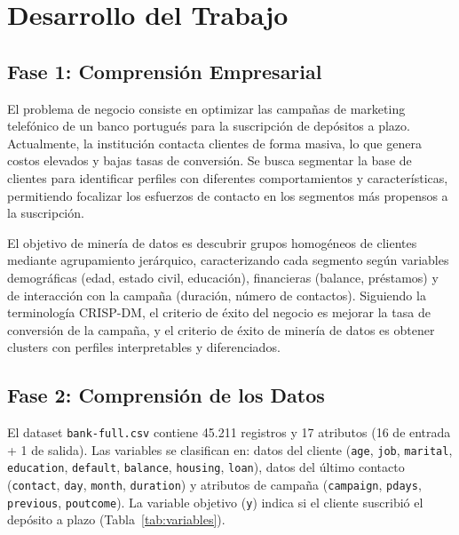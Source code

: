 \documentclass[10pt,a4paper]{article}
\begin{document}
\section{Desarrollo del Trabajo}

\subsection{Fase 1: Comprensión Empresarial}

El problema de negocio consiste en optimizar las campañas de marketing telefónico de un banco portugués para la suscripción de depósitos a plazo. Actualmente, la institución contacta clientes de forma masiva, lo que genera costos elevados y bajas tasas de conversión. Se busca segmentar la base de clientes para identificar perfiles con diferentes comportamientos y características, permitiendo focalizar los esfuerzos de contacto en los segmentos más propensos a la suscripción.

El objetivo de minería de datos es descubrir grupos homogéneos de clientes mediante agrupamiento jerárquico, caracterizando cada segmento según variables demográficas (edad, estado civil, educación), financieras (balance, préstamos) y de interacción con la campaña (duración, número de contactos). Siguiendo la terminología CRISP-DM, el criterio de éxito del negocio es mejorar la tasa de conversión de la campaña, y el criterio de éxito de minería de datos es obtener clusters con perfiles interpretables y diferenciados.

\subsection{Fase 2: Comprensión de los Datos}

El dataset \texttt{bank-full.csv} contiene 45.211 registros y 17 atributos (16 de entrada + 1 de salida). Las variables se clasifican en: datos del cliente (\texttt{age}, \texttt{job}, \texttt{marital}, \texttt{education}, \texttt{default}, \texttt{balance}, \texttt{housing}, \texttt{loan}), datos del último contacto (\texttt{contact}, \texttt{day}, \texttt{month}, \texttt{duration}) y atributos de campaña (\texttt{campaign}, \texttt{pdays}, \texttt{previous}, \texttt{poutcome}). La variable objetivo (\texttt{y}) indica si el cliente suscribió el depósito a plazo (Tabla~\ref{tab:variables}).
\end{document}
